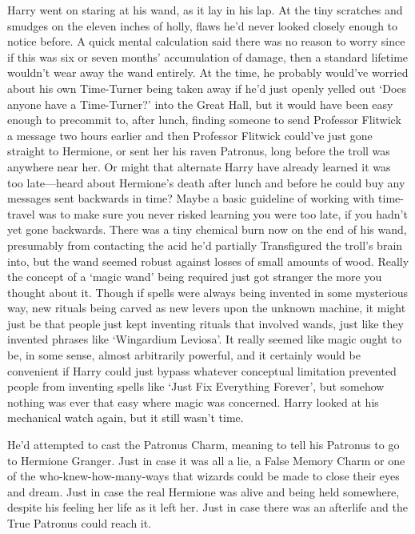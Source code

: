Harry went on staring at his wand, as it lay in his lap. At the tiny scratches
and smudges on the eleven inches of holly, flaws he'd never looked closely
enough to notice before. A quick mental calculation said there was no reason to
worry since if this was six or seven months' accumulation of damage, then a
standard lifetime wouldn't wear away the wand entirely. At the time, he
probably would've worried about his own Time-Turner being taken away if he'd
just openly yelled out `Does anyone have a Time-Turner?' into the Great Hall,
but it would have been easy enough to precommit to, after lunch, finding
someone to send Professor Flitwick a message two hours earlier and then
Professor Flitwick could've just gone straight to Hermione, or sent her his
raven Patronus, long before the troll was anywhere near her. Or might that
alternate Harry have already learned it was too late---heard about Hermione's
death after lunch and before he could buy any messages sent backwards in time?
Maybe a basic guideline of working with time-travel was to make sure you never
risked learning you were too late, if you hadn't yet gone backwards. There was
a tiny chemical burn now on the end of his wand, presumably from contacting the
acid he'd partially Transfigured the troll's brain into, but the wand seemed
robust against losses of small amounts of wood. Really the concept of a `magic
wand' being required just got stranger the more you thought about it. Though if
spells were always being invented in some mysterious way, new rituals being
carved as new levers upon the unknown machine, it might just be that people
just kept inventing rituals that involved wands, just like they invented
phrases like `Wingardium Leviosa'. It really seemed like magic ought to be, in
some sense, almost arbitrarily powerful, and it certainly would be convenient
if Harry could just bypass whatever conceptual limitation prevented people from
inventing spells like `Just Fix Everything Forever', but somehow nothing was
ever that easy where magic was concerned. Harry looked at his mechanical watch
again, but it still wasn't time.

He'd attempted to cast the Patronus Charm, meaning to tell his Patronus to go
to Hermione Granger. Just in case it was all a lie, a False Memory Charm or one
of the who-knew-how-many-ways that wizards could be made to close their eyes
and dream. Just in case the real Hermione was alive and being held somewhere,
despite his feeling her life as it left her. Just in case there was an
afterlife and the True Patronus could reach it.

